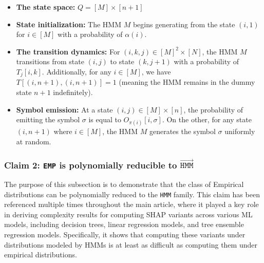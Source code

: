 \begin{itemize}
    \item \textbf{The state space:} $Q = [M] \times [n+1]$
    \item \textbf{State initialization:} The HMM $M$ begins generating from the state $(i,1)$ for $i \in [M]$ with a probability of $\alpha(i)$.
    
    \item \textbf{The transition dynamics:} For $(i,k,j) \in [M]^{2} \times [N]$, the HMM $M$ transitions from state $(i,j)$ to state $(k,j+1)$ with a probability of $T_{j}[i,k]$. Additionally, for any $i \in [M]$, we have $T[(i,n+1), (i,n+1)] = 1$ (meaning the HMM remains in the dummy state $n+1$ indefinitely).
    \item \textbf{Symbol emission:} At a state $(i,j) \in [M] \times [n]$, the probability of emitting the symbol $\sigma$ is equal to $O_{\pi(i)}[i,\sigma]$. On the other, for any state $(i,n+1)$ where $i \in [M]$, the HMM $M$ generates the symbol $\sigma$ uniformly at random. 
\end{itemize}

\subsubsection{Claim 2: \texttt{EMP} is polynomially reducible to $\overrightarrow{\texttt{HMM}}$}

The purpose of this subsection is to demonstrate that the class of Empirical distributions can be polynomially reduced to the \texttt{HMM} family. This claim has been referenced multiple times throughout the main article, where it played a key role in deriving complexity results for computing SHAP variants across various ML models, including decision trees, linear regression models, and tree ensemble regression models. Specifically, it shows that computing these variants under distributions modeled by HMMs is at least as difficult as computing them under empirical distributions. %

